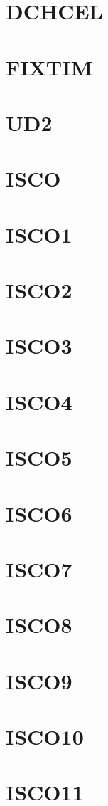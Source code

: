 \documentclass[14pt,UTF8]{ctexbook}
\begin{document}
\section{DCHCEL}
\section{FIXTIM}
\section{UD2}
\section{ISCO}
\section{ISCO1}
\section{ISCO2}
\section{ISCO3}
\section{ISCO4}
\section{ISCO5}
\section{ISCO6}
\section{ISCO7}
\section{ISCO8}
\section{ISCO9}
\section{ISCO10}
\section{ISCO11}
\end{document}
